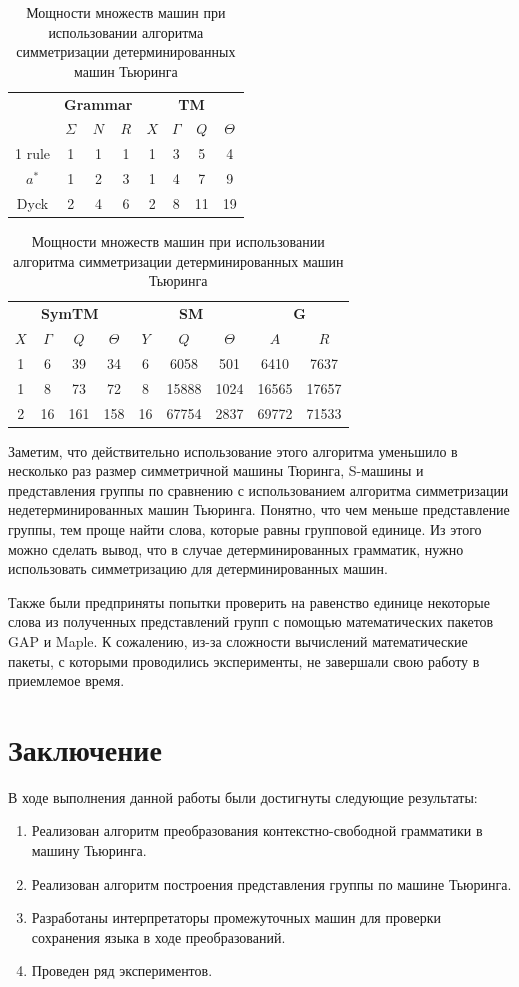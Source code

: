 \documentclass[14pt]{matmex-diploma-custom}
\begin{document}
\begin{table}[H]
\centering
\begin{tabular}{|c|
c|c|c|
c|c|c|c|}
\hline
&
\multicolumn{3}{|c|}{\textbf{Grammar}}&
\multicolumn{4}{|c|}{\textbf{TM}}\\
\cline{2-8}
&$\Sigma$&$N$&$R$
&$X$&$\Gamma$&$Q$&$\Theta$\\
\hline
1 rule
&1&1&1
&1&3&5&4\\
\hline
$a^*$
&1&2&3
&1&4&7&9\\
\hline
Dyck
&2&4&6
&2&8&11&19\\
\hline
\end{tabular}
\begin{tabular}{
|c|c|c|c|
c|c|c|
c|c|}
\hline
\multicolumn{4}{|c|}{\textbf{SymTM}}&
\multicolumn{3}{|c|}{\textbf{SM}}&
\multicolumn{2}{|c|}{\textbf{G}}\\
\cline{1-9}
$X$&$\Gamma$&$Q$&$\Theta$
&$Y$&$Q$&$\Theta$
&$A$&$R$\\
\hline
1&6&39&34
&6&6058&501
&6410&7637\\
\hline
1&8&73&72
&8&15888&1024
&16565&17657\\
\hline
2&16&161&158
&16&67754&2837
&69772&71533\\
\hline
\end{tabular}
\caption{Мощности множеств машин при использовании алгоритма симметризации детерминированных машин Тьюринга}
\label{tab:countdtm}
\end{table}

Заметим, что действительно использование этого алгоритма уменьшило в несколько раз размер симметричной машины Тюринга, S-машины и представления группы по сравнению с использованием алгоритма симметризации недетерминированных машин Тьюринга. Понятно, что чем меньше представление группы, тем проще найти слова, которые равны групповой единице. Из этого можно сделать вывод, что в случае детерминированных грамматик, нужно использовать симметризацию для детерминированных машин.

Также были предприняты попытки проверить на равенство единице некоторые слова из полученных представлений групп с помощью математических пакетов GAP и Maple. К сожалению, из-за сложности вычислений математические пакеты, с которыми проводились эксперименты, не завершали свою работу в приемлемое время.

\section*{Заключение}
В ходе выполнения данной работы были достигнуты следующие результаты:
\begin{enumerate}
    \item Реализован алгоритм преобразования контекстно-свободной грамматики в машину Тьюринга.
    \item Реализован алгоритм построения представления группы по машине Тьюринга.
    \item Разработаны интерпретаторы промежуточных машин для проверки сохранения языка в ходе преобразований.
    \item Проведен ряд экспериментов.
\end{enumerate}
\end{document}
